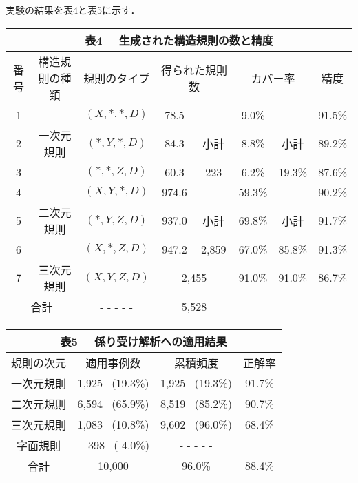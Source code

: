 実験の結果を表4と表5に示す．
 \begin{center}
   \setlength{\tabcolsep}{3pt}
   \small
    \begin{tabular}{|c|c|c|c|c|c|c|c|}
    \multicolumn{8}{c}{{\small {\bf 表4} \ \ 生成された構造規則の数と精度}}
     \\ \hline
 番号&構造規則の種類&規則のタイプ&\multicolumn{2}{c|}{得られた規則数}
     &\multicolumn{2}{c|}{カバー率}&精度\\ \hline
    1& &${(X,*,*,D)}$&78.5& &9.0\%& &91.5\% \\
     \cline{1-1}\cline{3-4}\cline{6-6}\cline{8-8}
    2&一次元規則&${(*,Y,*,D)}$&84.3&小計&8.8\%&小計&89.2\%\\
     \cline{1-1}\cline{3-4}\cline{6-6}\cline{8-8}
    3& &${(*,*,Z,D)}$&60.3&223&6.2\%&19.3\%&87.6\% \\ \hline
    4& &${(X,Y,*,D)}$&974.6& &59.3\%& &90.2\% \\
     \cline{1-1}\cline{3-4}\cline{6-6}\cline{8-8}
    5&二次元規則&${(*,Y,Z,D)}$&937.0&小計&69.8\%&小計&91.7\% \\
     \cline{1-1}\cline{3-4}\cline{6-6}\cline{8-8}
    6& &${(X,*,Z,D)}$&947.2&2,859&67.0\%&85.8\%&91.3\% \\ \hline
    7&三次元規則
     &${(X,Y,Z,D)}$&\multicolumn{2}{c|}{2,455}&91.0\%&91.0\%&86.7\%\\ \hline
    \multicolumn{2}{|c|}{合計}&- - - - -&\multicolumn{2}{c|}{5,528}& &
     &\\ \hline
\end{tabular}
\end{center}
 \begin{center}
   \setlength{\tabcolsep}{3pt}
   \small
    \begin{tabular}{|c|c|c|c|}
    \multicolumn{4}{c}{{\small {\bf 表5} \ \ 係り受け解析への適用結果}}
     \\ \hline
     規則の次元&適用事例数&累積頻度&正解率\\ \hline
     一次元規則&1,925 \ (19.3\%)&1,925 \ (19.3\%)&91.7\%\\ \hline
      二次元規則&6,594 \ (65.9\%)&8,519 \ (85.2\%)&90.7\%\\ \hline
     三次元規則&1,083 \ (10.8\%)&9,602 \ (96.0\%)&68.4\%\\ \hline
     字面規則& \ \  398 \ ( 4.0\%)&- - - - -&-- --\\ \hline
     合計&10,000&96.0\%&88.4\%\\ \hline
\end{tabular}
\end{center}

